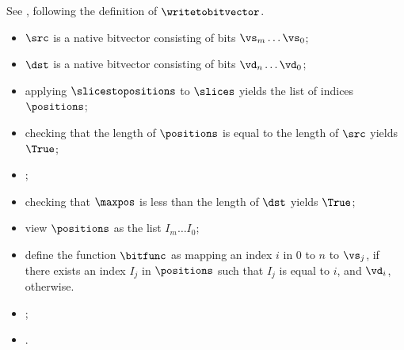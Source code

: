 See , following the definition of $\writetobitvector$.

\ProseParagraph
\AllApply
\begin{itemize}
  \item $\src$ is a native bitvector consisting of bits $\vs_m \ldots \vs_0$;
  \item $\dst$ is a native bitvector consisting of bits $\vd_n \ldots \vd_0$;
  \item applying $\slicestopositions$ to $\slices$ yields the list of indices $\positions$;
  \item checking that the length of $\positions$ is equal to the length of $\src$ yields $\True$\ProseTerminateAs{\BadIndex};
  \item {};
  \item checking that $\maxpos$ is less than the length of $\dst$ yields $\True$\ProseTerminateAs{\BadIndex};
  \item view $\positions$ as the list $I_m \ldots I_0$;
  \item define the function $\bitfunc$ as mapping an index $i$ in $0$ to $n$ to
        $\vs_j$, if there exists an index $I_j$ in $\positions$ such that $I_j$ is equal to $i$,
        and $\vd_i$, otherwise.
  \item {};
  \item {}.
\end{itemize}

